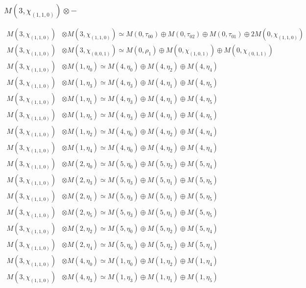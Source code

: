 \subsubsection{$ M(3,\chi_{(1,1,0)})\otimes -$}
\begin{align*}
M(3,\chi_{(1,1,0)}) &\otimes M(3,\chi_{(1,1,0)}) \simeq M(0,\tau_{00}) \oplus M(0,\tau_{02}) \oplus M(0,\tau_{01}) \oplus 2 M(0,\chi_{(1,1,0)})\\
M(3,\chi_{(1,1,0)}) &\otimes M(3,\chi_{(0,0,1)}) \simeq M(0,\rho_{1}) \oplus M(0,\chi_{(1,0,1)}) \oplus M(0,\chi_{(0,1,1)})\\
M(3,\chi_{(1,1,0)}) &\otimes M(1,\eta_{0}) \simeq M(4,\eta_{0}) \oplus M(4,\eta_{2}) \oplus M(4,\eta_{4})\\
M(3,\chi_{(1,1,0)}) &\otimes M(1,\eta_{3}) \simeq M(4,\eta_{3}) \oplus M(4,\eta_{1}) \oplus M(4,\eta_{5})\\
M(3,\chi_{(1,1,0)}) &\otimes M(1,\eta_{1}) \simeq M(4,\eta_{3}) \oplus M(4,\eta_{1}) \oplus M(4,\eta_{5})\\
M(3,\chi_{(1,1,0)}) &\otimes M(1,\eta_{5}) \simeq M(4,\eta_{3}) \oplus M(4,\eta_{1}) \oplus M(4,\eta_{5})\\
M(3,\chi_{(1,1,0)}) &\otimes M(1,\eta_{2}) \simeq M(4,\eta_{0}) \oplus M(4,\eta_{2}) \oplus M(4,\eta_{4})\\
M(3,\chi_{(1,1,0)}) &\otimes M(1,\eta_{4}) \simeq M(4,\eta_{0}) \oplus M(4,\eta_{2}) \oplus M(4,\eta_{4})\\
M(3,\chi_{(1,1,0)}) &\otimes M(2,\eta_{0}) \simeq M(5,\eta_{0}) \oplus M(5,\eta_{2}) \oplus M(5,\eta_{4})\\
M(3,\chi_{(1,1,0)}) &\otimes M(2,\eta_{3}) \simeq M(5,\eta_{3}) \oplus M(5,\eta_{1}) \oplus M(5,\eta_{5})\\
M(3,\chi_{(1,1,0)}) &\otimes M(2,\eta_{1}) \simeq M(5,\eta_{3}) \oplus M(5,\eta_{1}) \oplus M(5,\eta_{5})\\
M(3,\chi_{(1,1,0)}) &\otimes M(2,\eta_{5}) \simeq M(5,\eta_{3}) \oplus M(5,\eta_{1}) \oplus M(5,\eta_{5})\\
M(3,\chi_{(1,1,0)}) &\otimes M(2,\eta_{2}) \simeq M(5,\eta_{0}) \oplus M(5,\eta_{2}) \oplus M(5,\eta_{4})\\
M(3,\chi_{(1,1,0)}) &\otimes M(2,\eta_{4}) \simeq M(5,\eta_{0}) \oplus M(5,\eta_{2}) \oplus M(5,\eta_{4})\\
M(3,\chi_{(1,1,0)}) &\otimes M(4,\eta_{0}) \simeq M(1,\eta_{0}) \oplus M(1,\eta_{2}) \oplus M(1,\eta_{4})\\
M(3,\chi_{(1,1,0)}) &\otimes M(4,\eta_{3}) \simeq M(1,\eta_{3}) \oplus M(1,\eta_{1}) \oplus M(1,\eta_{5})\\

\end{align*}
